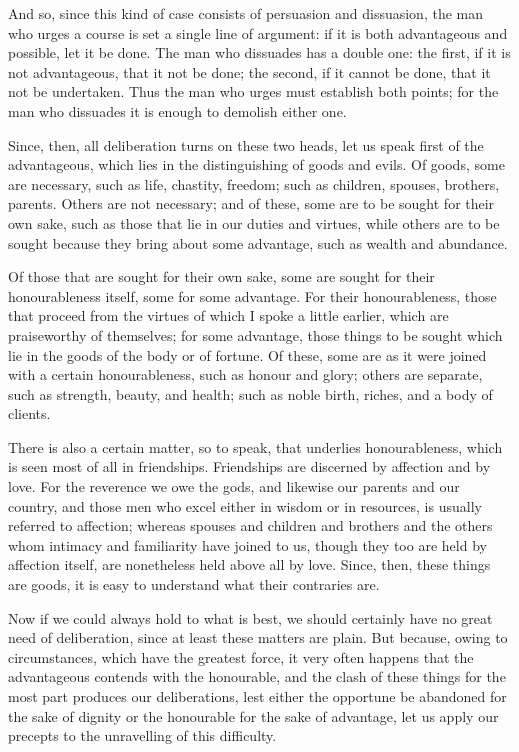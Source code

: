  And so, since this kind of case consists of persuasion and dissuasion, the man who urges a course is set a single line of argument: if it is both advantageous and possible, let it be done. The man who dissuades has a double one: the first, if it is not advantageous, that it not be done; the second, if it cannot be done, that it not be undertaken. Thus the man who urges must establish both points; for the man who dissuades it is enough to demolish either one.

 Since, then, all deliberation turns on these two heads, let us speak first of the advantageous, which lies in the distinguishing of goods and evils. Of goods, some are necessary, such as life, chastity, freedom; such as children, spouses, brothers, parents. Others are not necessary; and of these, some are to be sought for their own sake, such as those that lie in our duties and virtues, while others are to be sought because they bring about some advantage, such as wealth and abundance.

 Of those that are sought for their own sake, some are sought for their honourableness itself, some for some advantage. For their honourableness, those that proceed from the virtues of which I spoke a little earlier, which are praiseworthy of themselves; for some advantage, those things to be sought which lie in the goods of the body or of fortune. Of these, some are as it were joined with a certain honourableness, such as honour and glory; others are separate, such as strength, beauty, and health; such as noble birth, riches, and a body of clients.

 There is also a certain matter, so to speak, that underlies honourableness, which is seen most of all in friendships. Friendships are discerned by affection and by love. For the reverence we owe the gods, and likewise our parents and our country, and those men who excel either in wisdom or in resources, is usually referred to affection; whereas spouses and children and brothers and the others whom intimacy and familiarity have joined to us, though they too are held by affection itself, are nonetheless held above all by love. Since, then, these things are goods, it is easy to understand what their contraries are.

 Now if we could always hold to what is best, we should certainly have no great need of deliberation, since at least these matters are plain. But because, owing to circumstances, which have the greatest force, it very often happens that the advantageous contends with the honourable, and the clash of these things for the most part produces our deliberations, lest either the opportune be abandoned for the sake of dignity or the honourable for the sake of advantage, let us apply our precepts to the unravelling of this difficulty.

